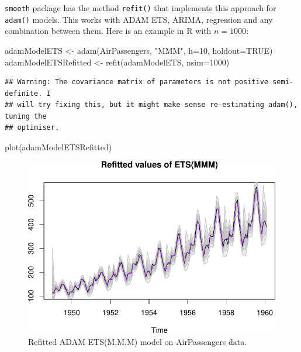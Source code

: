 \documentclass[
]{book}
\newenvironment{Shaded}{\begin{snugshade}}{\end{snugshade}}
\newcommand{\AttributeTok}[1]{\textcolor[rgb]{0.77,0.63,0.00}{#1}}
\newcommand{\ConstantTok}[1]{\textcolor[rgb]{0.00,0.00,0.00}{#1}}
\newcommand{\DecValTok}[1]{\textcolor[rgb]{0.00,0.00,0.81}{#1}}
\newcommand{\FunctionTok}[1]{\textcolor[rgb]{0.00,0.00,0.00}{#1}}
\newcommand{\NormalTok}[1]{#1}
\newcommand{\OtherTok}[1]{\textcolor[rgb]{0.56,0.35,0.01}{#1}}
\newcommand{\StringTok}[1]{\textcolor[rgb]{0.31,0.60,0.02}{#1}}
\theoremstyle{definition}
\theoremstyle{definition}
\theoremstyle{definition}
\theoremstyle{definition}
\theoremstyle{remark}
\begin{document}
\texttt{smooth} package has the method \texttt{refit()} that implements this approach for \texttt{adam()} models. This works with ADAM ETS, ARIMA, regression and any combination between them. Here is an example in R with \(n=1000\):

\begin{Shaded}
\begin{Highlighting}[]
\NormalTok{adamModelETS }\OtherTok{\textless{}{-}} \FunctionTok{adam}\NormalTok{(AirPassengers, }\StringTok{"MMM"}\NormalTok{, }\AttributeTok{h=}\DecValTok{10}\NormalTok{, }\AttributeTok{holdout=}\ConstantTok{TRUE}\NormalTok{)}
\NormalTok{adamModelETSRefitted }\OtherTok{\textless{}{-}} \FunctionTok{refit}\NormalTok{(adamModelETS, }\AttributeTok{nsim=}\DecValTok{1000}\NormalTok{)}
\end{Highlighting}
\end{Shaded}

\begin{verbatim}
## Warning: The covariance matrix of parameters is not positive semi-definite. I
## will try fixing this, but it might make sense re-estimating adam(), tuning the
## optimiser.
\end{verbatim}

\begin{Shaded}
\begin{Highlighting}[]
\FunctionTok{plot}\NormalTok{(adamModelETSRefitted)}
\end{Highlighting}
\end{Shaded}

\begin{figure}
\centering
\includegraphics{adam_files/figure-latex/adamETSRefitted-1.pdf}
\caption{\label{fig:adamETSRefitted}Refitted ADAM ETS(M,M,M) model on AirPassengers data.}
\end{figure}
\end{document}

